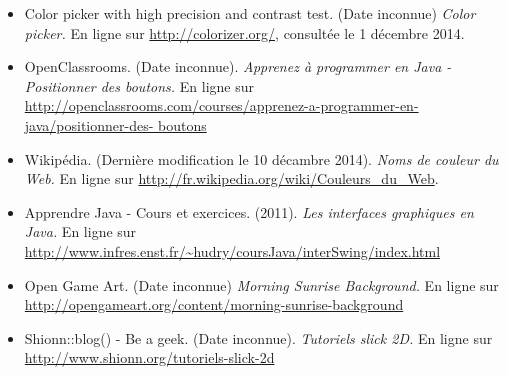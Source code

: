 \documentclass[a4paper,titlepage]{article}
\begin{document}
\begin{itemize}
	\item Color picker with high precision and contrast test. (Date inconnue) \textit{Color picker.} En ligne sur \url{http://colorizer.org/}, consultée le 1 décembre 2014.
	\item OpenClassrooms. (Date inconnue). \textit{Apprenez à programmer en Java - Positionner des boutons.} En ligne sur \url{http://openclassrooms.com/courses/apprenez-a-programmer-en-java/positionner-des-
boutons}
	\item Wikipédia. (Dernière modification le 10 décambre 2014). \textit{Noms de couleur du Web.} En ligne sur \url{http://fr.wikipedia.org/wiki/Couleurs_du_Web}.
	\item Apprendre Java - Cours et exercices. (2011). \textit{Les interfaces graphiques en Java.} En ligne sur \url{http://www.infres.enst.fr/~hudry/coursJava/interSwing/index.html}
	\item Open Game Art. (Date inconnue) \textit{Morning Sunrise Background.} En ligne sur \url{http://opengameart.org/content/morning-sunrise-background}
	\item Shionn::blog() - Be a geek. (Date inconnue). \textit{Tutoriels slick 2D.} En ligne sur \url{http://www.shionn.org/tutoriels-slick-2d}
\end{itemize}
	
	\clearpage	
	
\end{document}
